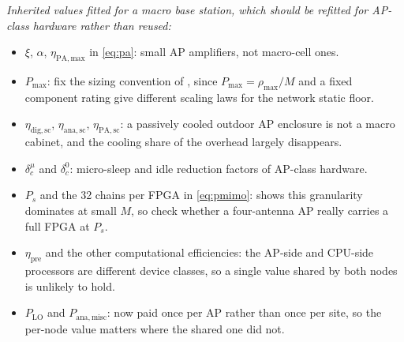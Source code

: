 {\emph{Inherited values fitted for a macro base station, which should be refitted
for AP-class hardware rather than reused:}
\begin{itemize}
\item $\xi$, $\alpha$, $\eta_{\mathrm{PA,max}}$ in \eqref{eq:pa}: small AP
      amplifiers, not macro-cell ones.
\item $P_{\max}$: fix the sizing convention of , since
      $P_{\max}=\rho_{\max}/M$ and a fixed component rating give different
      scaling laws for the network static floor.
\item $\eta_{\mathrm{dig,sc}}$, $\eta_{\mathrm{ana,sc}}$,
      $\eta_{\mathrm{PA,sc}}$: a passively cooled outdoor AP enclosure is not a
      macro cabinet, and the cooling share of the overhead largely disappears.
\item $\delta^{\mu}_{c}$ and $\delta^{0}_{c}$: micro-sleep and idle reduction
      factors of AP-class hardware.
\item $P_{s}$ and the 32 chains per FPGA in \eqref{eq:pmimo}: 
      shows this granularity dominates at small $M$, so check whether a
      four-antenna AP really carries a full FPGA at $P_{s}$.
\item $\eta_{\mathrm{pre}}$ and the other computational efficiencies: the AP-side
      and CPU-side processors are different device classes, so a single value
      shared by both nodes is unlikely to hold.
\item $P_{\mathrm{LO}}$ and $P_{\mathrm{ana,misc}}$: now paid once per AP rather
      than once per site, so the per-node value matters where the shared one did
      not.
\end{itemize}}
